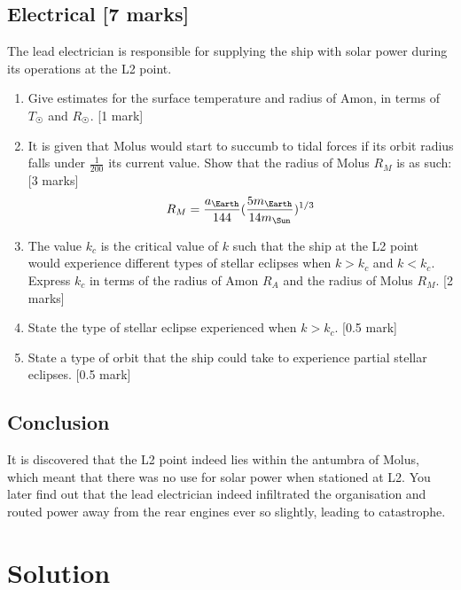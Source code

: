 \documentclass{article}
\begin{document}
\subsection{Electrical [7 marks]}
The lead electrician is responsible for supplying the ship with solar power during its operations at the L2 point.
\begin{enumerate}
\item Give estimates for the surface temperature and radius of Amon, in terms of $T_\Sun$ and $R_\Sun$. [1 mark]
\item It is given that Molus would start to succumb to tidal forces if its orbit radius falls under $\frac{1}{200}$ its current value. Show that the radius of Molus $R_M$ is as such: [3 marks]
\begin{equation}
R_M=\frac{a_\Earth}{144}(\frac{5m_\Earth}{14m_\Sun})^{1/3}
\end{equation}
\item The value $k_c$ is the critical value of $k$ such that the ship at the L2 point would experience different types of stellar eclipses when $k>k_c$ and $k<k_c$. Express $k_c$ in terms of the radius of Amon $R_A$ and the radius of Molus $R_M$. [2 marks]
\item State the type of stellar eclipse experienced when $k>k_c$. [0.5 mark]
\item State a type of orbit that the ship could take to experience partial stellar eclipses. [0.5 mark]
\end{enumerate}

\subsection{Conclusion}
It is discovered that the L2 point indeed lies within the antumbra of Molus, which meant that there was no use for solar power when stationed at L2. You later find out that the lead electrician indeed infiltrated the organisation and routed power away from the rear engines ever so slightly, leading to catastrophe.

\section{Solution}
\end{document}
